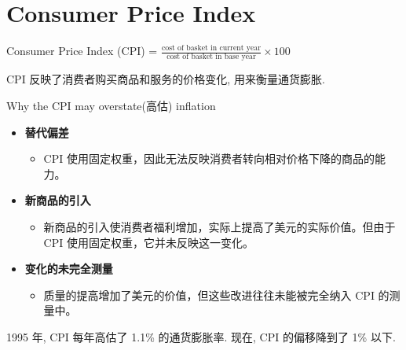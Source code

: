 \section{Consumer Price Index}
\begin{definition}
    Consumer Price Index (CPI) = $\frac{\text{cost of basket in current year}}{\text{cost of basket in base year}} \times 100$
\end{definition}
\begin{note}
    CPI 反映了消费者购买商品和服务的价格变化, 用来衡量通货膨胀.
\end{note}
\begin{problem}
    Why the CPI may overstate(高估) inflation 
\end{problem}

\begin{itemize}
    \item \textbf{替代偏差}
    \begin{itemize}
        \item CPI 使用固定权重，因此无法反映消费者转向相对价格下降的商品的能力。
    \end{itemize}
    \item \textbf{新商品的引入}
    \begin{itemize}
        \item 新商品的引入使消费者福利增加，实际上提高了美元的实际价值。但由于 CPI 使用固定权重，它并未反映这一变化。
    \end{itemize}
    \item \textbf{变化的未完全测量}
    \begin{itemize}
        \item 质量的提高增加了美元的价值，但这些改进往往未能被完全纳入 CPI 的测量中。
    \end{itemize}
\end{itemize}
\begin{note}
    1995 年, CPI 每年高估了 1.1\% 的通货膨胀率. 现在, CPI 的偏移降到了 1\% 以下.
\end{note}

